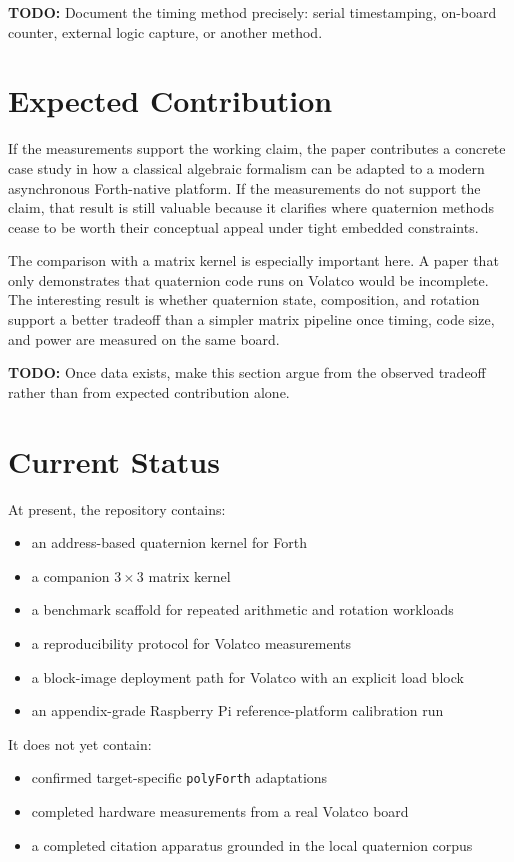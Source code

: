 \documentclass[11pt]{article}
\newcommand{\todoitem}[1]{%
  \par\noindent\textbf{TODO:} #1\par
}
\begin{document}
\todoitem{Document the timing method precisely: serial timestamping, on-board
counter, external logic capture, or another method.}

\section{Expected Contribution}

If the measurements support the working claim, the paper contributes a concrete
case study in how a classical algebraic formalism can be adapted to a modern
asynchronous Forth-native platform. If the measurements do not support the
claim, that result is still valuable because it clarifies where quaternion
methods cease to be worth their conceptual appeal under tight embedded
constraints.

The comparison with a matrix kernel is especially important here. A paper that
only demonstrates that quaternion code runs on Volatco would be incomplete. The
interesting result is whether quaternion state, composition, and rotation
support a better tradeoff than a simpler matrix pipeline once timing, code
size, and power are measured on the same board.

\todoitem{Once data exists, make this section argue from the observed tradeoff
rather than from expected contribution alone.}

\section{Current Status}

At present, the repository contains:

\begin{itemize}
\item an address-based quaternion kernel for Forth
\item a companion $3\times 3$ matrix kernel
\item a benchmark scaffold for repeated arithmetic and rotation workloads
\item a reproducibility protocol for Volatco measurements
\item a block-image deployment path for Volatco with an explicit load block
\item an appendix-grade Raspberry Pi reference-platform calibration run
\end{itemize}

It does not yet contain:

\begin{itemize}
\item confirmed target-specific \texttt{polyForth} adaptations
\item completed hardware measurements from a real Volatco board
\item a completed citation apparatus grounded in the local quaternion corpus
\end{itemize}
\end{document}
